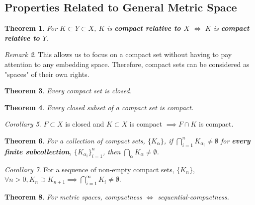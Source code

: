 \documentclass[a4paper,12pt]{report}
\newcommand{\tb}{\textbf}
\theoremstyle{plain}
\newtheorem{theorem}{\color{blue}Theorem}[chapter] %
\theoremstyle{definition}
\theoremstyle{remark}
\newtheorem{remark}[theorem]{\color{ForestGreen}Remark} %
\newtheorem{corollary}[theorem]{\color{SkyBlue}Corollary} %
\begin{document}
\subsection{Properties Related to General Metric Space}
\begin{theorem}
For $K\subset Y\subset X$, $K$ is \tb{compact relative to $X$} $\iff$ $K$ is \tb{compact relative to $Y$}.
\end{theorem}
\begin{remark}
This allows us to focus on a compact set without having to pay attention to any embedding space. Therefore, compact sets can be considered as "spaces" of their own rights.
\end{remark}
\begin{theorem}
Every compact set is closed.
\end{theorem}
\begin{theorem}
Every closed subset of a compact set is compact.
\end{theorem}
\begin{corollary}
$F\subset X$ is closed and $K\subset X$ is compact $\implies F\cap K$ is compact.
\end{corollary}
\begin{theorem}
For a collection of compact sets, $\{K_\alpha\}$, if  $\bigcap_{i=1}^n K_{\alpha_i}\neq\emptyset$ for \tb{every finite subcollection}, $\{K_{\alpha_i}\}_{i=1}^n$, then $\bigcap_\alpha K_\alpha\neq\emptyset$.
\end{theorem}
\begin{corollary}
For a sequence of non-empty compact sets, $\{K_n\}$, $\forall n>0, K_n\supset K_{n+1}\implies \bigcap_{i=1}^\infty K_i\neq\emptyset$.
\end{corollary}
\begin{theorem}
For metric spaces, compactness $\iff$ sequential-compactness.
\end{theorem}
\end{document}
